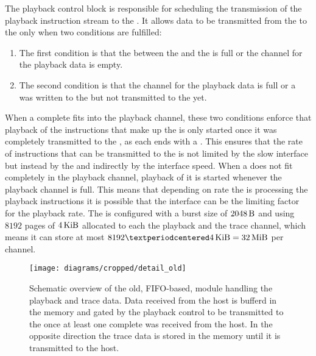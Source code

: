 The playback control block is responsible for scheduling the transmission of the playback instruction stream to the \pbexec{}.
It allows data to be transmitted from the \VFIFO{} to the \pbexec{} only when two conditions are fulfilled:
\begin{enumerate}
\item The first condition is that the \FIFO{} between the \VFIFO{} and the \pbexec{} is full or the \VFIFO{} channel for the playback data is empty.
\item The second condition is that the \VFIFO{} channel for the playback data is full or a \haltInstr{} was written to the \VFIFO{} but not transmitted to the \pbexec{} yet.
\end{enumerate}
When a complete \PlaybackProgram{} fits into the \VFIFO{} playback channel, these two conditions enforce that playback of the instructions that make up the \PlaybackProgram{} is only started once it was completely transmitted to the \VFIFO{}, as each \PlaybackProgram{} ends with a \haltInstr{}. This ensures that the rate of instructions that can be transmitted to the \pbexec{} is not limited by the slow \HostARQ{} interface but instead by the \VFIFO{} and indirectly by the \XilinxMIG{} interface speed.
When a \PlaybackProgram{} does not fit completely in the \VFIFO{} playback channel, playback of it is started whenever the \VFIFO{} playback channel is full. This means that depending on rate the \pbexec{} is processing the playback instructions it is possible that the \HostARQ{} interface can be the limiting factor for the playback rate.
The \VFIFO{} is configured with a burst size of \(\SI{2048}{\byte}\) and using $\num{8192}$ pages of $\SI{4}{\kibi\byte}$ allocated to each the playback and the trace channel, which means it can store at most \(\num{8192} · \SI{4}{\kibi\byte} = \SI{32}{\mebi\byte}\) per channel.

\begin{figure}
\centerline{\texttt{[image: diagrams/cropped/detail\_old]}}
\caption{Schematic overview of the old, FIFO{}-based, module handling the playback and trace data. Data received from the host is bufferd in the \DDR{} memory and gated by the playback control to be transmitted to the \pbexec{} once at least one complete \PlaybackProgram{} was received from the host. In the opposite direction the trace data is stored in the \DDR{} memory until it is transmitted to the host.}\label{diagram:detail_old}
\end{figure}


